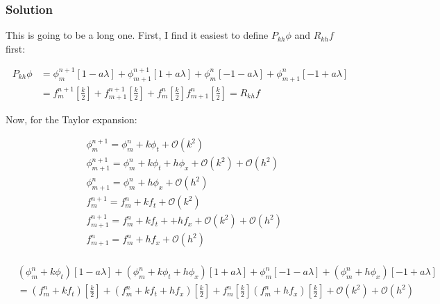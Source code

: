 \documentclass[12pt]{article}
\begin{document}
\subsubsection*{Solution}

This is going to be a long one. First, I find it easiest to define $P_{kh}\phi$ and $R_{kh}f$ first:

\begin{equation*}
    \begin{aligned}
    P_{kh}\phi & = \phi_m^{n+1}[1-a\lambda] + 
    \phi_{m+1}^{n+1}[1+a\lambda] + 
    \phi_{m}^{n}[-1-a\lambda] + 
    \phi_{m+1}^{n}[-1+a\lambda] \\
     & = f_{m}^{n+1}\left[\frac{k}{2}\right] +f_{m+1}^{n+1}\left[\frac{k}{2}\right] +f_{m}^{n}\left[\frac{k}{2}\right] f_{m+1}^{n}\left[\frac{k}{2}\right] = R_{kh}f
    \end{aligned}
\end{equation*}

\noindent Now, for the Taylor expansion:

\begin{equation*}
\begin{aligned}
	&\phi_m^{n+1} = \phi_m^n + k\phi_t + \mathcal{O}(k^2)\\
	&\phi_{m+1}^{n+1} = \phi_m^n + k\phi_t + h\phi_x+ \mathcal{O}(k^2)+ \mathcal{O}(h^2)\\
	&\phi_{m+1}^n = \phi_m^n + h\phi_x + \mathcal{O}(h^2)\\
	&f_m^{n+1} = f_m^n + kf_t + \mathcal{O}(k^2)\\
	&f_{m+1}^{n+1} = f_m^n + kf_t + +hf_x +\mathcal{O}(k^2)+ \mathcal{O}(h^2)\\
	&f_{m+1}^{n} = f_m^n + hf_x + \mathcal{O}(h^2)\\
\end{aligned}
\end{equation*}

\begin{equation*}
    \begin{aligned}
    &(\phi_m^n + k\phi_t)[1-a\lambda] + 
    (\phi_m^n + k\phi_t + h\phi_x)[1+a\lambda] + 
    \phi_{m}^{n}[-1-a\lambda] + 
    (\phi_m^n + h\phi_x)[-1+a\lambda] \\
     &= (f_m^n + kf_t)\left[\frac{k}{2}\right] +
     (f_m^n + kf_t + hf_x)\left[\frac{k}{2}\right] +
     f_{m}^{n}\left[\frac{k}{2}\right] 
     (f_m^n + hf_x)\left[\frac{k}{2}\right]+\mathcal{O}(k^2)+ \mathcal{O}(h^2)
    \end{aligned}
\end{equation*}
\end{document}
